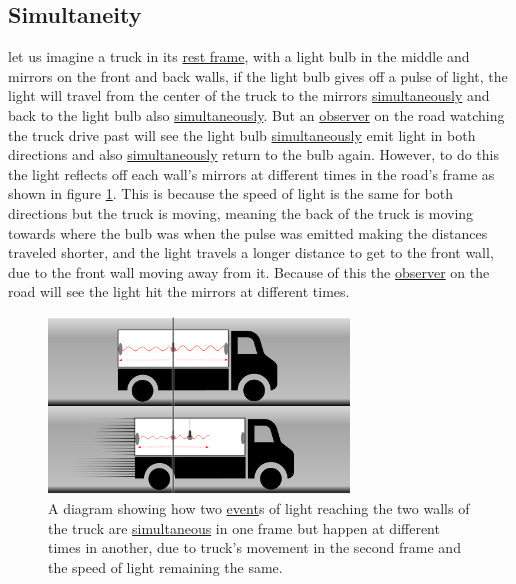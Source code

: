 \subsection{Simultaneity}

let us imagine a truck in its \hyperlink{def-proper-frame}{rest frame}, with a light bulb in the middle and mirrors on the front and back walls, if the light bulb gives off a pulse of light, the light will travel from the center of the truck to the mirrors \hyperlink{def-simultaneity}{simultaneously} and back to the light bulb also \hyperlink{def-simultaneity}{simultaneously}. But an \hyperlink{def-observer}{observer} on the road watching the truck drive past will see the light bulb \hyperlink{def-simultaneity}{simultaneously} emit light in both directions and also \hyperlink{def-simultaneity}{simultaneously} return to the bulb again. However, to do this the light reflects off each wall's mirrors at different times in the road's frame as shown in figure \ref{fig: truck simultaneity}. This is because the speed of light is the same for both directions but the truck is moving, meaning the back of the truck is moving towards where the bulb was when the pulse was emitted making the distances traveled shorter, and the light travels a longer distance to get to the front wall, due to the front wall moving away from it. Because of this the \hyperlink{def-observer}{observer} on the road will see the light hit the mirrors at different times.

\begin{figure}[htbp]
	\centering
	\includegraphics[width=8cm]{images/pdf/lorry_simul.pdf}
	\caption{A diagram showing how two \protect\hyperlink{def-event}{event}s of light reaching the two walls of the truck are \protect\hyperlink{def-simultaneity}{simultaneous} in one frame but happen at different times in another, due to truck's movement in the second frame and the speed of light remaining the same.}
	\label{fig: truck simultaneity}
\end{figure}

